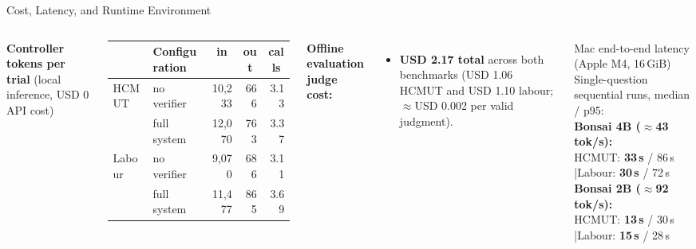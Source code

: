 \documentclass[aspectratio=1610,11pt]{beamer}
\newcommand{\cell}[1]{\multicolumn{1}{c}{#1}}
\begin{document}
\begin{frame}{Cost, Latency, and Runtime Environment}
  \begin{columns}[T]
    \footnotesize
    \textbf{Controller tokens per trial} (local inference, USD 0 API cost)
    \vspace{3pt}

    \begin{tabular}{@{}llrrr@{}}
      \toprule & Configuration & \cell{in} & \cell{out} & \cell{calls}\\\midrule
      HCMUT & no verifier & 10,233 & 666 & 3.13\\
      & full system & 12,070 & 763 & 3.37\\
      Labour & no verifier & 9,070 & 686 & 3.11\\
      & full system & 11,477 & 865 & 3.69\\
      \bottomrule
    \end{tabular}
    \vspace{6pt}

    \textbf{Offline evaluation judge cost:}
    \begin{itemize}\footnotesize
      \item \textbf{USD 2.17 total} across both benchmarks (USD 1.06 HCMUT and USD 1.10 labour; $\approx$USD 0.002 per valid judgment).
    \end{itemize}

    \begin{alertblock}{Mac end-to-end latency (Apple M4, 16\,GiB)}
      \footnotesize Single-question sequential runs, median / p95:\\[3pt]
      \textbf{Bonsai 4B ($\approx$43 tok/s):}\\
      \quad HCMUT: \textbf{33\,s} / 86\,s \quad|\quad Labour: \textbf{30\,s} / 72\,s\\[3pt]
      \textbf{Bonsai 2B ($\approx$92 tok/s):}\\
      \quad HCMUT: \textbf{13\,s} / 30\,s \quad|\quad Labour: \textbf{15\,s} / 28\,s
    \end{alertblock}
    \vspace{1pt}


\end{columns}
\end{frame}
\end{document}
